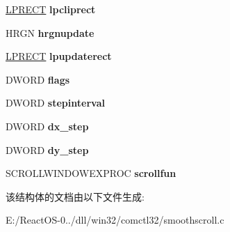 \begin{DoxyCompactItemize}
\hyperlink{structtag_r_e_c_t}{L\+P\+R\+E\+CT} {\bfseries lpcliprect}
\item 
\mbox{\label{structtag_s_m_o_o_t_h_s_c_r_o_l_l_s_t_r_u_c_t_a3088e511de7d902748a3ff86cdc0f55d}} 
H\+R\+GN {\bfseries hrgnupdate}
\item 
\mbox{\label{structtag_s_m_o_o_t_h_s_c_r_o_l_l_s_t_r_u_c_t_a2a173ce81e4a9fb8aa314822f7cee9a3}} 
\hyperlink{structtag_r_e_c_t}{L\+P\+R\+E\+CT} {\bfseries lpupdaterect}
\item 
\mbox{\label{structtag_s_m_o_o_t_h_s_c_r_o_l_l_s_t_r_u_c_t_a6b2e8a41c9ccb2fc61ceab7680e0f197}} 
D\+W\+O\+RD {\bfseries flags}
\item 
\mbox{\label{structtag_s_m_o_o_t_h_s_c_r_o_l_l_s_t_r_u_c_t_a01c17487454f59b2f95523bd49c05bd9}} 
D\+W\+O\+RD {\bfseries stepinterval}
\item 
\mbox{\label{structtag_s_m_o_o_t_h_s_c_r_o_l_l_s_t_r_u_c_t_ab353bfe5af487bebe4ec9201ab32a35c}} 
D\+W\+O\+RD {\bfseries dx\+\_\+step}
\item 
\mbox{\label{structtag_s_m_o_o_t_h_s_c_r_o_l_l_s_t_r_u_c_t_affcd7e27a4d8a7e20cb7137803926872}} 
D\+W\+O\+RD {\bfseries dy\+\_\+step}
\item 
\mbox{\label{structtag_s_m_o_o_t_h_s_c_r_o_l_l_s_t_r_u_c_t_a351cd8a910890fcbe1bf42265443edff}} 
S\+C\+R\+O\+L\+L\+W\+I\+N\+D\+O\+W\+E\+X\+P\+R\+OC {\bfseries scrollfun}
\end{DoxyCompactItemize}


该结构体的文档由以下文件生成\+:\begin{DoxyCompactItemize}
\item 
E\+:/\+React\+O\+S-\/0../dll/win32/comctl32/smoothscroll.\+c\end{DoxyCompactItemize}
